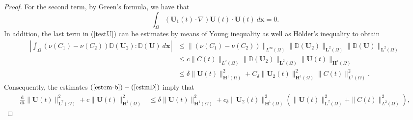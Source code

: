 \documentclass[10pt,number,preprint,times]{elsarticle}
\numberwithin{equation}{section} %
\begin{document}
\begin{proof}
		For the second term, by Green's formula, we have that
		\begin{equation}\label{estm-b-null} 
			\int_{\Omega}( \boldsymbol{U}_1(t)\cdot \nabla) \boldsymbol{U}(t)\cdot \boldsymbol{U}(t)~d{\mathbf{x}}=0.
		\end{equation}
		In addition, the last term in (\ref{testU})  can be estimates by means of  Young inequality as well as H{\"o}lder's inequality to obtain
		\begin{equation}\label{estmD}
			\begin{aligned}
				\left|\int_{\Omega}\left(\nu(C_1)-\nu(C_{2})\right) \mathbb{D}(\boldsymbol{U}_{2}): \mathbb{D}(\boldsymbol{U})~d{\mathbf{x}}\right|
				& \leq \|(\nu(C_1)-\nu(C_{2}))\|_{L^{\infty}(\Omega)}
				\| \mathbb{D}(\boldsymbol{U}_{2})\|_{\mathbf{L}^{2}(\Omega)} \|\mathbb{D}(\boldsymbol{U})\|_{\mathbf{L}^{2}(\Omega)} \\
				& \leq c\|C(t)\|_{L^2(\Omega)}
				\| \mathbb{D}(\boldsymbol{U}_{2})\|_{\boldsymbol{L}^{2}(\Omega)} \|\boldsymbol{U}(t)\|_{\mathbf{H}^{1}(\Omega)}\\
				& \leq \delta \|\boldsymbol{U}(t)\|_{\boldsymbol{H}^{1}(\Omega)}^2+C_\delta
				\|\boldsymbol{U}_{2}(t)\|_{\mathbf{H}^{1}(\Omega)}^2\|C(t)\|_{L^2(\Omega)}^2.
			\end{aligned}
		\end{equation}
		Consequently, the estimates $(\ref{estem-b})-(\ref{estmD})$ imply that
		\begin{equation}\label{estmU}
			\begin{aligned}
				\frac{\mathrm{d}}{\mathrm{d} t}\|\boldsymbol{U}(t)\|_{\boldsymbol{L}^2(\Omega)}^{2}+c\|\boldsymbol{U}(t)\|_{\boldsymbol{H}^1(\Omega)}^{2}  & \leq \delta \|\boldsymbol{U}(t)\|_{\boldsymbol{H}^{1}(\Omega)}^2+
				c_{\delta}\|\boldsymbol{U}_{2}(t)\|_{\mathbf{H}^{1}(\Omega)}^2\left(\|\boldsymbol{U}(t)\|_{\mathbf{L}^{2}(\Omega)}^{2}+\|C(t)\|_{L^2(\Omega)}^2\right), 
			\end{aligned} 
		\end{equation} 

\end{proof}
\end{document}
